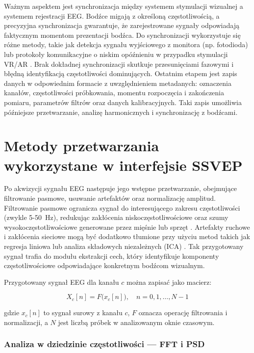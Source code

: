 Ważnym aspektem jest synchronizacja między systemem stymulacji wizualnej a systemem rejestracji EEG. Bodźce migają z określoną częstotliwością, a precyzyjna synchronizacja gwarantuje, że zarejestrowane sygnały odpowiadają faktycznym momentom prezentacji bodźca. Do synchronizacji wykorzystuje się różne metody, takie jak detekcja sygnału wyjściowego z monitora (np. fotodioda) lub protokoły komunikacyjne o niskim opóźnieniu w przypadku stymulacji VR/AR \cite{nakanishi2018}. Brak dokładnej synchronizacji skutkuje przesunięciami fazowymi i błędną identyfikacją częstotliwości dominujących. Ostatnim etapem jest zapis danych w odpowiednim formacie z uwzględnieniem metadanych: oznaczenia kanałów, częstotliwości próbkowania, momentu rozpoczęcia i zakończenia pomiaru, parametrów filtrów oraz danych kalibracyjnych. Taki zapis umożliwia późniejsze przetwarzanie, analizę harmonicznych i synchronizację z bodźcami.

\section{Metody przetwarzania wykorzystane w interfejsie SSVEP}

Po akwizycji sygnału EEG następuje jego wstępne przetwarzanie, obejmujące filtrowanie pasmowe, usuwanie artefaktów oraz normalizację amplitud. Filtrowanie pasmowe ogranicza sygnał do interesującego zakresu częstotliwości (zwykle 5-50~Hz), redukując zakłócenia niskoczęstotliwościowe oraz szumy wysokoczęstotliwościowe generowane przez mięśnie lub sprzęt \cite{vialatte2010, wang2020}. Artefakty ruchowe i zakłócenia sieciowe mogą być dodatkowo tłumione przy użyciu metod takich jak regresja liniowa lub analiza składowych niezależnych (ICA) \cite{makeig1996}. Tak przygotowany sygnał trafia do modułu ekstrakcji cech, który identyfikuje komponenty częstotliwościowe odpowiadające konkretnym bodźcom wizualnym.

Przygotowany sygnał EEG dla kanału $c$ można zapisać jako macierz:

\[
X_c[n] = F\big(x_c[n]\big), \quad n = 0,1,\dots,N-1
\]

\noindent gdzie $x_c[n]$ to sygnał surowy z kanału $c$, $F$ oznacza operację filtrowania i normalizacji, a $N$ jest liczbą próbek w analizowanym oknie czasowym.

\subsubsection{Analiza w dziedzinie częstotliwości — FFT i PSD}

